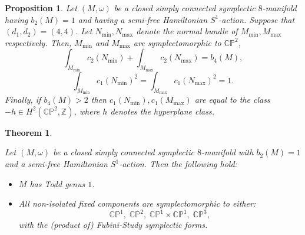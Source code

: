 \documentclass[10pt,a4paper]{amsart}
\newtheorem{proposition}{Proposition}
\newtheorem{theorem}{Theorem}
\begin{document}
\begin{proposition} \label{fourfourcase}
Let $(M,\omega)$ be a closed simply connected symplectic $8$-manifold having $b_{2}(M)=1$ and having a semi-free Hamiltonian $S^1$-action. Suppose that $(d_1,d_2) = (4,4)$. Let $N_{\min},N_{\max}$ denote the normal bundle of $M_{\min},M_{\max}$ respectively. Then, $M_{\min}$ and $M_{\max}$ are symplectomorphic to $\mathbb{CP}^2$,  $$\int_{M_{\min}} c_{2}(N_{\min}) + \int_{M_{\max}}c_{2}(N_{\max}) =b_{4}(M),$$ $$\int_{M_{\min}} c_{1}(N_{\min})^2 = \int_{M_{\max}} c_{1}(N_{\max})^2 =1.$$ Finally, if $b_{4}(M) > 2$ then $c_{1}(N_{\min}),c_{1}(M_{\max})$ are equal to the class$-h \in H^{2}(\mathbb{CP}^2,\mathbb{Z})$, where $h$ denotes the hyperplane class.
\end{proposition}

\begin{theorem} \label{intermediate}

 
Let $(M,\omega)$ be a closed simply connected symplectic $8$-manifold with $b_{2}(M)=1$ and a semi-free Hamiltonian $S^1$-action. Then the following hold:
\begin{itemize}
\item[a).] $M$  has Todd genus $1$.
\item[b).] All non-isolated fixed  components are symplectomorphic to either: $$ \mathbb{CP}^1,\;\mathbb{CP}^2, \; \mathbb{CP}^1 \times \mathbb{CP}^1,\; \mathbb{CP}^3,$$ with the (product of) Fubini-Study symplectic forms.
\end{itemize}
\end{theorem}
\end{document}
